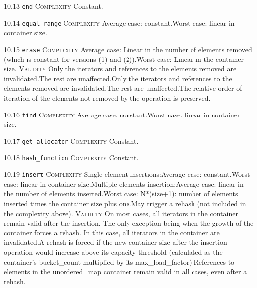 \noindent\textcolor{cgreen}{10.13 \texttt{end}} \textsc{Complexity} Constant. \vspace{0.5em}

\noindent\textcolor{corange}{10.14 \texttt{equal\_range}} \textsc{Complexity} Average case: constant.Worst case: linear in container size. \vspace{0.5em}

\noindent\textcolor{corange}{10.15 \texttt{erase}} \textsc{Complexity} Average case: Linear in the number of elements removed (which is constant for versions (1) and (2)).Worst case: Linear in the container size. \textsc{Validity} Only the iterators and references to the elements removed are invalidated.The rest are unaffected.Only the iterators and references to the elements removed are invalidated.The rest are unaffected.The relative order of iteration of the elements not removed by the operation is preserved.\vspace{0.5em}

\noindent\textcolor{corange}{10.16 \texttt{find}} \textsc{Complexity} Average case: constant.Worst case: linear in container size. \vspace{0.5em}

\noindent\textcolor{cgreen}{10.17 \texttt{get\_allocator}} \textsc{Complexity} Constant. \vspace{0.5em}

\noindent\textcolor{cgreen}{10.18 \texttt{hash\_function}} \textsc{Complexity} Constant. \vspace{0.5em}

\noindent\textcolor{corange}{10.19 \texttt{insert}} \textsc{Complexity} Single element insertions:Average case: constant.Worst case: linear in container size.Multiple elements insertion:Average case: linear in the number of elements inserted.Worst case: N*(size+1): number of elements inserted times the container size plus one.May trigger a rehash (not included in the complexity above). \textsc{Validity} On most cases, all iterators in the container remain valid after the insertion. The only exception being when the growth of the container forces a rehash. In this case, all iterators in the container are invalidated.A rehash is forced if the new container size after the insertion operation would increase above its capacity threshold (calculated as the container's bucket\_count multiplied by its max\_load\_factor).References to elements in the unordered\_map container remain valid in all cases, even after a rehash.\vspace{0.5em}

